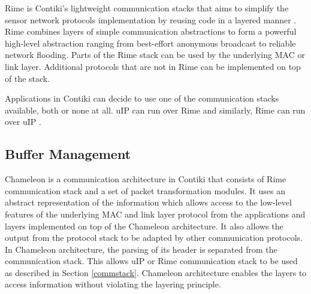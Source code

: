 Rime is Contiki's lightweight communication stacks that aims to simplify the sensor network protocols implementation by reusing code in a layered manner \cite{rimeposter}. Rime combines layers of simple communication abstractions to form a powerful high-level abstraction ranging from best-effort anonymous broadcast to reliable network flooding. Parts of the Rime stack can be used by the underlying MAC or link layer. Additional protocols that are not in Rime can be implemented on top of the stack.

Applications in Contiki can decide to use one of the communication stacks available, both or none at all. uIP can run over Rime and similarly, Rime can run over uIP \cite{contikitutorial}. 





\subsection{Buffer Management}
Chameleon \cite{rime} is a communication architecture in Contiki that consists of Rime communication stack and a set of packet transformation modules. It uses an abstract representation of the information which allows access to the low-level features of the underlying MAC and link layer protocol from the applications and layers implemented on top of the Chameleon architecture. It also allows the output from the protocol stack to be adapted by other communication protocols. In Chameleon architecture, the parsing of its header is separated from the communication stack. This allows uIP or Rime communication stack to be used as described in Section \ref{commstack}. Chameleon architecture enables the layers to access information without violating the layering principle. 

